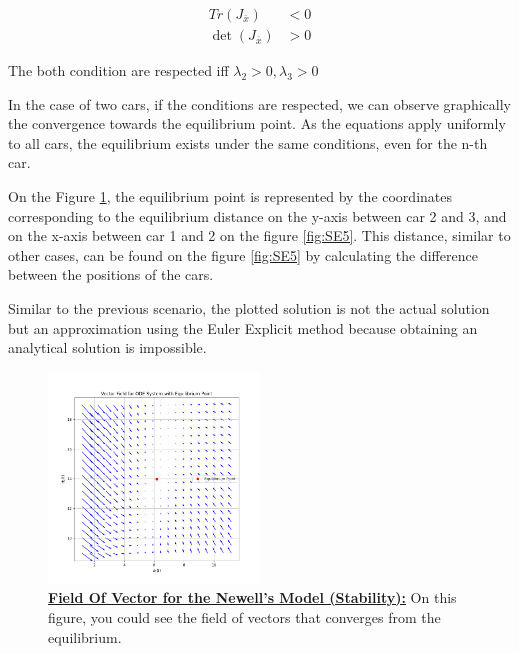 \documentclass{article}
\begin{document}
	\[
	\boxed{
		\begin{aligned}
			Tr(J_{\bar{x}}) &< 0 \\
			\det(J_{\bar{x}}) &> 0
		\end{aligned}
	}
	\]

	The both condition are respected iff $\lambda_2>0, \lambda_3>0$
	 \newline\newline
	 
	In the case of two cars, if the conditions are respected, we can observe graphically the convergence towards the equilibrium point. As the equations apply uniformly to all cars, the equilibrium exists under the same conditions, even for the n-th car.
	
	On the Figure \ref{fig:SE4}, the equilibrium point is represented by the coordinates corresponding to the equilibrium distance on the y-axis between car 2 and 3, and on the x-axis between car 1 and 2 on the figure \ref{fig:SE5}. This distance, similar to other cases, can be found on the figure \ref{fig:SE5} by calculating the difference between the positions of the cars.
	
	Similar to the previous scenario, the plotted solution is not the actual solution but an approximation using the Euler Explicit method because obtaining an analytical solution is impossible.
	 
	 
	 \begin{figure}[H]
	 	\centering
	 	\includegraphics[width=0.5\textwidth]{VectorField1.png}
	 	\caption[Field Of Vector for the Newell's Model (Stability):]{\textbf{\underline{Field Of Vector for the Newell's Model (Stability):}} On this figure, you could see the field of vectors that converges from the equilibrium.}
	 	\label{fig:SE4}
	 \end{figure}
	 
\end{document}
